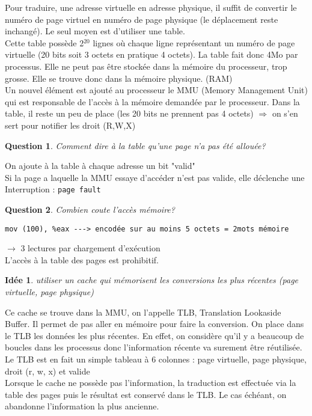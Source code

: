 \documentclass[12pt,a4paper]{report}
\newtheorem*{q}{Question}
\newtheorem*{id}{Idée}
\begin{document}
Pour traduire, une adresse virtuelle en adresse physique, il suffit de convertir le numéro de page virtuel en numéro de page physique (le déplacement reste inchangé).
Le seul moyen est d'utiliser une table.\\
Cette table possède 2$^{20}$ lignes où chaque ligne représentant un numéro de page virtuelle (20 bits soit 3 octets en pratique 4 octets). La table fait donc 4Mo par processus. Elle ne peut pas être stockée dans la mémoire du processeur, trop grosse. Elle se trouve donc dans la mémoire physique. (RAM)\\

Un nouvel élément est ajouté au processeur le MMU (Memory Management Unit) qui est responsable de l'accès à la mémoire demandée par le processeur.
Dans la table, il reste un peu de place (les 20 bits ne prennent pas 4 octets) $\Rightarrow$ on s'en sert pour notifier les droit (R,W,X)\\

\begin{q}Comment dire à la table qu'une page n'a pas été allouée?\end{q}
On  ajoute à la table à chaque adresse un bit "valid"\\
Si la page a laquelle la MMU essaye d’accéder n'est pas valide, elle déclenche une Interruption : \verb?page fault?\\

\begin{q}Combien  coute l'accès mémoire?\end{q}
\begin{verbatim}
mov (100), %eax ---> encodée sur au moins 5 octets = 2mots mémoire
\end{verbatim}
$\longrightarrow$ 3 lectures par chargement d’exécution \\
L'accès à la table des pages est prohibitif.\\
\begin{id} utiliser un cache qui mémorisent les conversions les plus récentes (page virtuelle, page physique)\end{id}
Ce cache se trouve dans la MMU, on l'appelle TLB, Translation Lookaside Buffer. Il permet de pas aller en mémoire pour faire la conversion. On place dans le TLB les données les plus récentes. En effet, on considère qu'il y a beaucoup de boucles dans les processus donc l'information récente va surement être réutilisée.\\
Le TLB est en fait un simple tableau à 6 colonnes : page virtuelle, page physique, droit (r, w, x) et valide\\
Lorsque le cache ne possède pas l'information, la traduction est effectuée via la table des pages puis le résultat est conservé dans le TLB. Le cas échéant, on abandonne l'information la plus ancienne.
\end{document}
